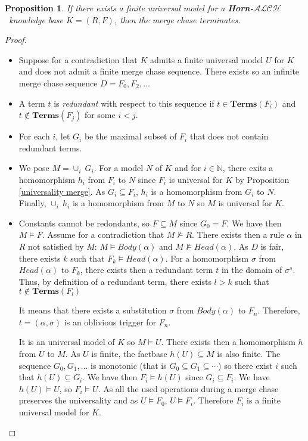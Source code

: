 \documentclass{article}
\newtheorem{proposition}{Proposition}[section]
\theoremstyle{definition}
\theoremstyle{remark}
\def \N {\mathbb N}
\newcommand{\Terms}{\textbf{Terms}}
\newcommand{\ALCH}{\textbf{Horn-$\mathcal{ALCH}$}}
\begin{document}
\begin{proposition} \label{finite -> terminates}
If there exists a finite universal model for a \ALCH\ knowledge base $K = (R,F)$, then the merge chase terminates.
\end{proposition}

\begin{proof}
\begin{itemize}
\item Suppose for a contradiction that $K$ admits a finite universal model $U$ for $K$ and does not admit a finite merge chase sequence. There exists so an infinite merge chase sequence $D= F_0, F_2, \ldots$
\item A term $t$ is \emph{redundant} with respect to this sequence if $t \in \Terms(F_i)$ and $t \notin \Terms(F_j)$ for some $i < j$.
\item For each $i$, let $G_i$ be the maximal subset of $F_i$ that does not contain redundant terms.

\item We pose $M = \cup_i~G_i$. For a model $N$ of $K$ and for $i \in \N$, there exits a homomorphism $h_i$ from $F_i$ to $N$ since $F_i$ is universal for $K$ by Proposition \ref{universality merge}. As $G_i \subseteq F_i$, $h_i$ is a homomorphism from $G_i$ to $N$. Finally, $\cup_i~h_i$ is a homomorphism from $M$ to $N$ so $M$ is universal for $K$.

\item Constants cannot be redondants, so $F \subseteq M$ since $G_0 =F$. We have then $M \vDash F$. Assume for a contradiction that $M \nvDash R$. There exists then a rule $\alpha$ in $R$ not satisfied by $M$: $M \vDash \textit{Body}(\alpha)$ and $M \nvDash \textit{Head}(\alpha)$. As $D$ is fair, there exists $k$ such that $F_k \vDash \textit{Head}(\alpha)$. For a homomorphism $\sigma$ from $\textit{Head}(\alpha)$ to $F_k$, there exists then a redundant term $t$ in the domain of $\sigma^s$. Thus, by definition of a redundant term, there exists $l > k$ such that $t \notin \Terms(F_l)$ 


It means that there exists a substitution $\sigma$ from $\textit{Body}(\alpha)$ to $F_n$. Therefore, $t=(\alpha,\sigma)$ is an oblivious trigger for $F_n$.

It is an universal model of $K$ so $M \models U$. There exists then a homomorphism $h$ from $U$ to $M$. As $U$ is finite, the factbase $h(U)\subseteq M$ is also finite. The sequence $G_0,G_1,\ldots$ is monotonic (that is $G_0 \subseteq G_1 \subseteq \cdots$) so there exist $i$ such that $h(U) \subseteq G_i$. We have then $F_i \models h(U)$ since $G_i \subseteq F_i$. We have $h(U) \models U$, so $F_i\models U$. As all the used operations during a merge chase preserves the universality and as $U \models F_0$, $U \models F_i$. Therefore $F_i$ is a finite universal model for $K$.


\end{itemize}
\end{proof}
\end{document}
